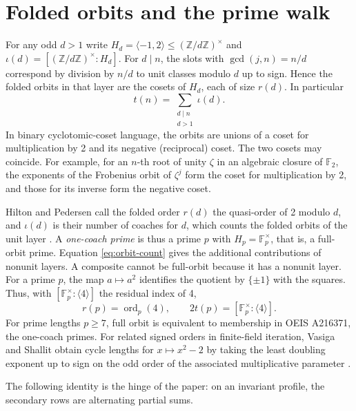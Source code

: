 \documentclass[11pt,reqno]{amsart}
\newcommand{\Z}{\mathbb Z}
\newcommand{\F}{\mathbb F}
\newcommand{\ord}{\operatorname{ord}}
\begin{document}
\section{Folded orbits and the prime walk}\label{sec:prime}
For any odd \(d>1\) write \(H_d=\langle-1,2\rangle\le(\Z/d\Z)^\times\) and \(\iota(d)=[(\Z/d\Z)^\times:H_d]\). For \(d\mid n\), the slots with \(\gcd(j,n)=n/d\) correspond by division by \(n/d\) to unit classes modulo \(d\) up to sign. Hence the folded orbits in that layer are the cosets of \(H_d\), each of size \(r(d)\). In particular
\begin{equation}\label{eq:orbit-count}
 t(n)=\sum_{\substack{d\mid n\\d>1}}\iota(d).
\end{equation}
In binary cyclotomic-coset language, the orbits are unions of a coset for multiplication by 2 and its negative (reciprocal) coset. The two cosets may coincide. For example, for an \(n\)-th root of unity \(\zeta\) in an algebraic closure of \(\F_2\), the exponents of the Frobenius orbit of \(\zeta^j\) form the coset for multiplication by 2, and those for its inverse form the negative coset.

Hilton and Pedersen call the folded order \(r(d)\) the quasi-order of 2 modulo \(d\), and \(\iota(d)\) is their number of coaches for \(d\), which counts the folded orbits of the unit layer \cite[\S17.2]{HPbook}\cite{HP,OEIS}. A \emph{one-coach prime} is thus a prime \(p\) with \(H_p=\F_p^\times\), that is, a full-orbit prime. Equation \eqref{eq:orbit-count} gives the additional contributions of nonunit layers. A composite cannot be full-orbit because it has a nonunit layer. For a prime \(p\), the map \(a\mapsto a^2\) identifies the quotient by \(\{\pm1\}\) with the squares. Thus, with \([\F_p^\times:\langle4\rangle]\) the residual index of 4,
\begin{equation}\label{eq:residual}
 r(p)=\ord_p(4),\qquad 2t(p)=[\F_p^\times:\langle4\rangle].
\end{equation}
For prime lengths \(p\ge7\), full orbit is equivalent to membership in OEIS A216371, the one-coach primes. For related signed orders in finite-field iteration, Vasiga and Shallit obtain cycle lengths for \(x\mapsto x^2-2\) by taking the least doubling exponent up to sign on the odd order of the associated multiplicative parameter \cite[Theorem~12 and Corollary~15]{VS}.

The following identity is the hinge of the paper: on an invariant profile, the secondary rows are alternating partial sums.
\end{document}
